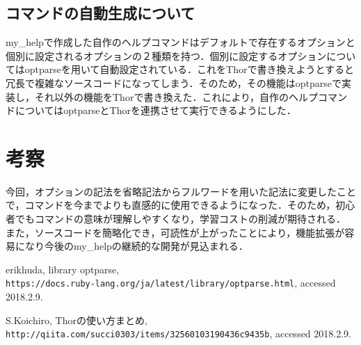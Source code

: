 \documentclass[a4j,twocolumn]{jsarticle}
\begin{document}
\subsection{コマンドの自動生成について}

my\_helpで作成した自作のヘルプコマンドはデフォルトで存在するオプションと個別に設定されるオプションの２種類を持つ．個別に設定するオプションについてはoptparseを用いて自動設定されている．これをThorで書き換えようとすると冗長で複雑なソースコードになってしまう．そのため，その機能はoptparseで実装し，それ以外の機能をThorで書き換えた．これにより，自作のヘルプコマンドについてはoptparseとThorを連携させて実行できるようにした．
\section{考察}
今回，オプションの記法を省略記法からフルワードを用いた記法に変更したことで，コマンドを今までよりも直感的に使用できるようになった．そのため，初心者でもコマンドの意味が理解しやすくなり，学習コストの削減が期待される．
また，ソースコードを簡略化でき，可読性が上がったことにより，機能拡張が容易になり今後のmy\_helpの継続的な開発が見込まれる．

\vspace{0.3\baselineskip}

{\small\setlength\baselineskip{10pt}	%
\begin{thebibliography}{9}


 erikhuda, library optparse,  \\
\texttt{https://docs.ruby-lang.org/ja/latest/library\slash optparse.html}, 
accessed 2018.2.9.

 S.Koichiro,
Thorの使い方まとめ,\\
\texttt{http://qiita.com/succi0303/items\slash32560103190436c9435b}, 
accessed 2018.2.9.

\end{thebibliography}
}
\end{document}
